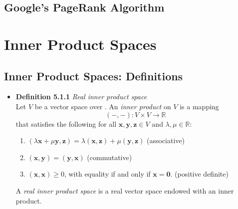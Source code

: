 \documentclass[11pt,a4paper]{article}
\begin{document}
\subsection{Google's PageRank Algorithm}

\section{Inner Product Spaces}

\subsection{Inner Product Spaces: Definitions}

\begin{itemize}

    \item \textbf{Definition 5.1.1} \emph{Real inner product space} \\
        Let $V$ be a vector space over .
        An \emph{inner product} on $V$ is a mapping
        \[
            (-, -) : V \times V \to \mathbb{R}
        \]
        that satisfies the following for all $\mathbf{x}, \mathbf{y}, \mathbf{z} \in V$
        and $\lambda, \mu \in \mathbb{R}$:
        \begin{enumerate}
            \item $(\lambda \mathbf{x} + \mu \mathbf{y}, \mathbf{z}) =
                \lambda(\mathbf{x}, \mathbf{z}) + \mu(\mathbf{y}, \mathbf{z})$
                \quad (associative)
            \item $(\mathbf{x}, \mathbf{y}) = (\mathbf{y}, \mathbf{x})$
                \quad (commutative)
            \item $(\mathbf{x}, \mathbf{x}) \geq 0$,
                with equality if and only if $\mathbf{x} = \mathbf{0}$.
                \quad (positive definite)
        \end{enumerate}
        A \emph{real inner product space} is a real vector space endowed with an inner product.


\end{itemize}
\end{document}
